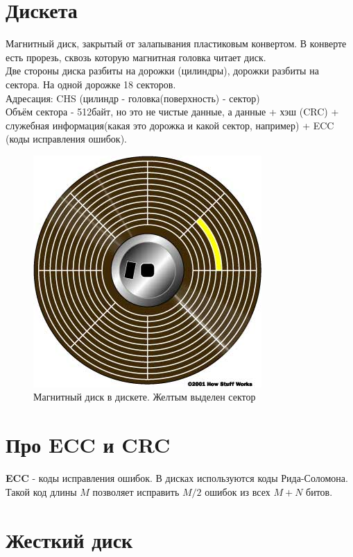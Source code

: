 \documentclass[12pt, a4paper]{article}
\begin{document}
\section{Дискета}
Магнитный диск, закрытый от залапывания пластиковым конвертом. В конверте есть прорезь, сквозь которую магнитная головка читает диск.\\
Две стороны диска разбиты на дорожки (цилиндры), дорожки разбиты на сектора. На одной дорожке 18 секторов.\\
Адресация: CHS (цилиндр - головка(поверхность) - сектор)\\
Объём сектора - 512байт, но это не чистые данные, а данные + хэш (CRC) + служебная информация(какая это дорожка и какой сектор, например) + ECC (коды исправления ошибок).
\begin{figure}[h]
    \includegraphics[scale=0.6]{./images/floppy-disk-track.jpg}
    \caption{Магнитный диск в дискете. Желтым выделен сектор}
    \label{fig:floppy-disk-track}
\end{figure}
\section{Про ECC и CRC}
\textbf{ECC} - коды исправления ошибок. В дисках используются коды Рида-Соломона. Такой код длины $M$ позволяет исправить $M / 2$ ошибок из всех $M + N$ битов. 
\section{Жесткий диск}

\section{}
\end{document}
